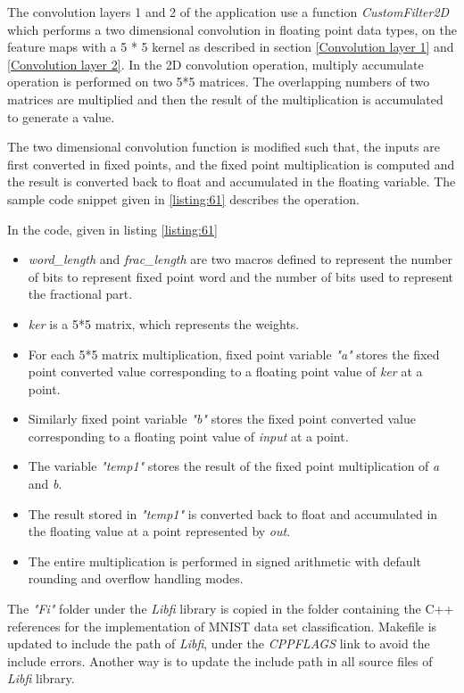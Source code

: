 \vspace{0.25cm}
The convolution layers 1 and 2 of the application use a function \textit{CustomFilter2D} which performs a two dimensional convolution in floating point data types, on the feature maps with a 5 * 5 kernel as described in section \ref{Convolution layer 1} and \ref{Convolution layer 2}. In the 2D convolution operation, multiply accumulate operation is performed on two 5*5 matrices. The overlapping numbers of two matrices are multiplied and then the result of the multiplication is accumulated to generate a value.

\vspace{0.25cm}
The two dimensional convolution function is modified such that, the inputs are first converted in fixed points, and the fixed point multiplication is computed and the result is converted back to float and accumulated in the floating variable. The sample code snippet given in \ref{listing:61} describes the operation.


\vspace{0.25cm}
In the code, given in listing \ref{listing:61}
\begin{itemize}
\item
\textit{word\_length} and \textit{frac\_length} are two macros defined to represent the number of bits to represent fixed point word and the number of bits used to represent the fractional part.
\item
\textit{ker} is a 5*5 matrix, which represents the weights.
\item
For each 5*5 matrix multiplication, fixed point variable \textit{"a"} stores the fixed point converted value corresponding to a floating point value of \textit{ker} at a point.
\item
Similarly fixed point variable \textit{"b"} stores the fixed point converted value corresponding to a floating point value of \textit{input} at a point.
\item
The variable \textit{"temp1"} stores the result of the fixed point multiplication of \textit{a} and \textit{b}.
\item 
The result stored in \textit{"temp1"} is converted back to float and accumulated in the floating value at a point represented by \textit{out}.
\item 
The entire multiplication is performed in signed arithmetic with default rounding and overflow handling modes.
\end{itemize}
\noindent The \textit{"Fi"} folder under the \textit{Libfi} library is copied in the folder containing the C++ references for the implementation of MNIST data set classification. Makefile is updated to include the path of \textit{Libfi}, under the \textit{CPPFLAGS} link to avoid the include errors. Another way is to update the include path in all source files of \textit{Libfi} library.

